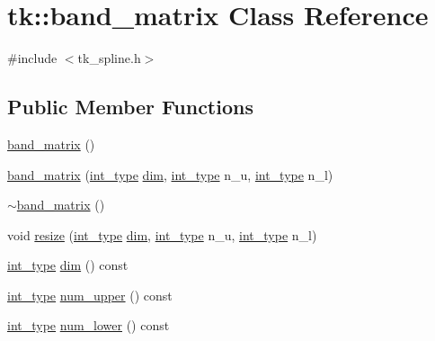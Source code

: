 \hypertarget{classtk_1_1band__matrix}{}\section{tk\+:\+:band\+\_\+matrix Class Reference}
\label{classtk_1_1band__matrix}


{\ttfamily \#include $<$tk\+\_\+spline.\+h$>$}

\subsection*{Public Member Functions}
\begin{DoxyCompactItemize}
\item 
\hyperlink{classtk_1_1band__matrix_a5a62f404ad5ae5cf01229e975eb3f2e6}{band\+\_\+matrix} ()
\item 
\hyperlink{classtk_1_1band__matrix_afd7ec8606a784f26fa3e4ba8eba38fd4}{band\+\_\+matrix} (\hyperlink{lib_2IceBRG__main_2common_8h_ac4de9d9335536ac22821171deec8d39e}{int\+\_\+type} \hyperlink{classtk_1_1band__matrix_a0e30948695f91e4f05ce0821ca727de9}{dim}, \hyperlink{lib_2IceBRG__main_2common_8h_ac4de9d9335536ac22821171deec8d39e}{int\+\_\+type} n\+\_\+u, \hyperlink{lib_2IceBRG__main_2common_8h_ac4de9d9335536ac22821171deec8d39e}{int\+\_\+type} n\+\_\+l)
\item 
\hyperlink{classtk_1_1band__matrix_a1d5af61e7df839f41ca2957176ca4cff}{$\sim$band\+\_\+matrix} ()
\item 
void \hyperlink{classtk_1_1band__matrix_a3a8be5ed65fe4e744547aa4b4687faa2}{resize} (\hyperlink{lib_2IceBRG__main_2common_8h_ac4de9d9335536ac22821171deec8d39e}{int\+\_\+type} \hyperlink{classtk_1_1band__matrix_a0e30948695f91e4f05ce0821ca727de9}{dim}, \hyperlink{lib_2IceBRG__main_2common_8h_ac4de9d9335536ac22821171deec8d39e}{int\+\_\+type} n\+\_\+u, \hyperlink{lib_2IceBRG__main_2common_8h_ac4de9d9335536ac22821171deec8d39e}{int\+\_\+type} n\+\_\+l)
\item 
\hyperlink{lib_2IceBRG__main_2common_8h_ac4de9d9335536ac22821171deec8d39e}{int\+\_\+type} \hyperlink{classtk_1_1band__matrix_a0e30948695f91e4f05ce0821ca727de9}{dim} () const 
\item 
\hyperlink{lib_2IceBRG__main_2common_8h_ac4de9d9335536ac22821171deec8d39e}{int\+\_\+type} \hyperlink{classtk_1_1band__matrix_a1634d67ea1342197c96f7b20ba15a693}{num\+\_\+upper} () const 
\item 
\hyperlink{lib_2IceBRG__main_2common_8h_ac4de9d9335536ac22821171deec8d39e}{int\+\_\+type} \hyperlink{classtk_1_1band__matrix_a6d99ecb9a597e3784c0c928771a2c0b5}{num\+\_\+lower} () const 

\end{DoxyCompactItemize}
